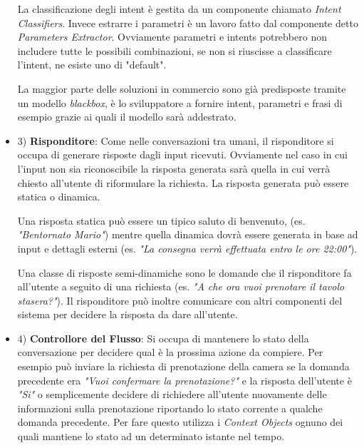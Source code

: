 \begin{itemize}
    La classificazione degli intent è gestita da un componente chiamato \textit{Intent Classifiers}. Invece estrarre i parametri è un lavoro fatto dal componente detto \textit{Parameters Extractor}. 
    Ovviamente parametri e intents potrebbero non includere tutte le possibili combinazioni, se non si riuscisse a classificare l'intent, ne esiste uno di "default". 
    
    La maggior parte delle soluzioni in commercio sono già predisposte tramite un modello \textit{blackbox}, è lo sviluppatore a fornire intent, parametri e frasi di esempio grazie ai quali il modello sarà addestrato.\pagebreak
    
    \item 3) \textbf{Risponditore}: Come nelle conversazioni tra umani, il risponditore si occupa di generare risposte dagli input ricevuti. Ovviamente nel caso in cui l'input non sia riconoscibile la risposta generata sarà quella in cui verrà chiesto all'utente di riformulare la richiesta. La risposta generata può essere statica o dinamica. 
    
    Una risposta statica può essere un tipico saluto di benvenuto, (es. \textit{"Bentornato Mario"}) mentre quella dinamica dovrà essere generata in base ad input e dettagli esterni (es. \textit{"La consegna verrà effettuata entro le ore 22:00"}). 
    
    Una classe di risposte semi-dinamiche sono le domande che il risponditore fa all'utente a seguito di una richiesta (es. \textit{"A che ora vuoi prenotare il tavolo stasera?"}). Il risponditore può inoltre comunicare con altri componenti del sistema per decidere la risposta da dare all'utente.
    
    \item 4) \textbf{Controllore del Flusso}: Si occupa di mantenere lo stato della conversazione per decidere qual è la prossima azione da compiere. Per esempio può inviare la richiesta di prenotazione della camera se la domanda precedente era \textit{"Vuoi confermare la prenotazione?"} e la risposta dell'utente è \textit{"Si"} o semplicemente decidere di richiedere all'utente nuovamente delle informazioni sulla prenotazione riportando lo stato corrente a qualche domanda precedente. Per fare questo utilizza i \textit{Context Objects} ognuno dei quali mantiene lo stato ad un determinato istante nel tempo.
    

\end{itemize}
